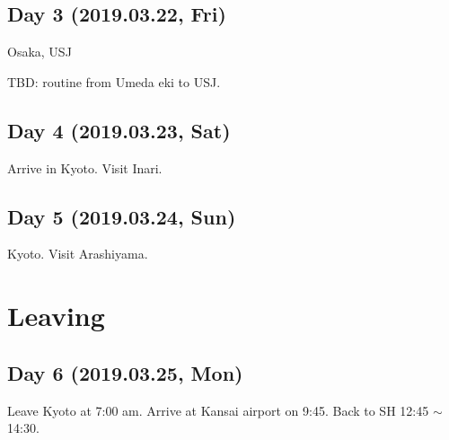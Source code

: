 \documentclass{article}
\begin{document}
\subsection{Day 3 (2019.03.22, Fri)}
Osaka, USJ

TBD: routine from Umeda eki to USJ.

\subsection{Day 4 (2019.03.23, Sat)}
Arrive in Kyoto.
Visit Inari.

\subsection{Day 5 (2019.03.24, Sun)}
Kyoto. Visit Arashiyama.

\section{Leaving}
\subsection{Day 6 (2019.03.25, Mon)}
Leave Kyoto at 7:00 am.
Arrive at Kansai airport on 9:45.
Back to SH 12:45 $\sim $ 14:30.
\end{document}
